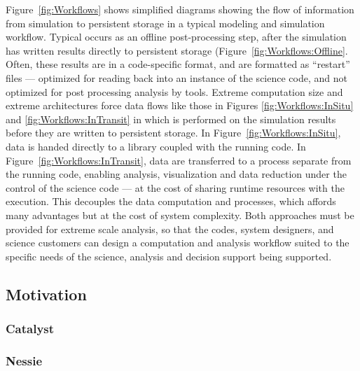 Figure~\ref{fig:Workflows} shows simplified diagrams showing the flow of
information from simulation to persistent storage in a typical modeling and
simulation workflow.  Typical \vda occurs as an offline post-processing
step, after the simulation has written results directly to persistent
storage (Figure~\ref{fig:Workflows:Offline}.  Often, these results are in a
code-specific format, and are formatted as ``restart'' files --- optimized
for reading back into an instance of the science code, and not optimized
for post processing analysis by \vda tools.  Extreme computation size and
extreme architectures force data flows like those in Figures
\ref{fig:Workflows:InSitu} and \ref{fig:Workflows:InTransit} in which \vda
is performed on the simulation results before they are written to
persistent storage.  In Figure~\ref{fig:Workflows:InSitu}, data is handed
directly to a \vda library coupled with the running code.  In
Figure~\ref{fig:Workflows:InTransit}, data are transferred to a \vda
process separate from the running code, enabling analysis, visualization
and data reduction under the control of the science code --- at the cost of
sharing runtime resources with the \vda execution.  This decouples the data
computation and \vda processes, which affords many advantages but at the
cost of system complexity.  Both approaches must be provided for extreme
scale analysis, so that the codes, system designers, and science customers
can design a computation and analysis workflow suited to the specific needs
of the science, analysis and decision support being supported.




\subsection{Motivation}



\subsubsection{Catalyst}

\subsubsection{Nessie}
